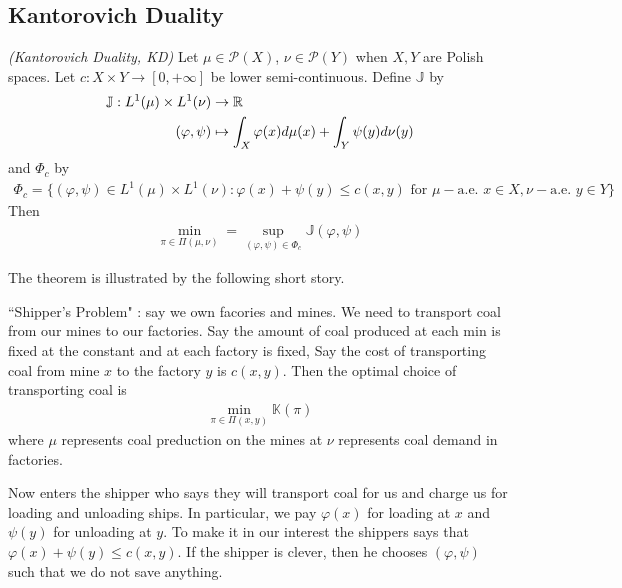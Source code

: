 \documentclass[12pt,a4paper]{article}
\begin{document}
\subsection{Kantorovich Duality}

 \emph{(Kantorovich Duality, KD)} Let $\mu \in \mathscr{P}(X)$, $\nu \in \mathscr{P}(Y)$ when $X, Y$ are Polish spaces. Let $c: X\times Y \rightarrow [0, +\infty]$ be lower semi-continuous. Define $\mathbb{J}$ by
\begin{align*}
\mathbb{J} : L^1(\mu) \times L^1(\nu) & \rightarrow \mathbb{R} \\
(\varphi, \psi) & \mapsto \int_X \varphi(x) d\mu(x) + \int_Y \psi(y)d\nu(y)
\end{align*}
and $\Phi_c$ by
\begin{align*}
\Phi_c = \{ (\varphi, \psi) \in L^1(\mu) \times L^1(\nu) : \varphi(x) + \psi(y) \leq c(x,y) \text{ for } \mu-\text{a.e. } x\in X, \nu-\text{a.e. } y\in Y \}
\end{align*}
Then
\begin{align*}
\min_{\pi \in \Pi(\mu, \nu)} = \sup_{(\varphi, \psi)\in \Phi_c} \mathbb{J}(\varphi, \psi)
\end{align*}
\s

The theorem is illustrated by the following short story.

``Shipper's Problem" : say we own facories and mines. We need to transport coal from our mines to our factories. Say the amount of coal produced at each min is fixed at the constant and at each factory is fixed, Say the cost of transporting coal from mine $x$ to the factory $y$ is $c(x,y)$. Then the optimal choice of transporting coal is
\begin{align*}
\min_{\pi \in \Pi(x,y)} \mathbb{K}(\pi)
\end{align*}
where $\mu$ represents coal preduction on the mines at $\nu$ represents coal demand in factories.

\quad Now enters the shipper who says they will transport coal for us and charge us for loading and unloading ships. In particular, we pay $\varphi(x)$ for loading at $x$ and $\psi(y)$  for unloading at $y$. To make it in our interest the shippers says that $\varphi(x) + \psi(y)\leq c(x,y)$. If the shipper is clever, then he chooses $(\varphi, \psi)$ such that we do not save anything.
\s
\end{document}
